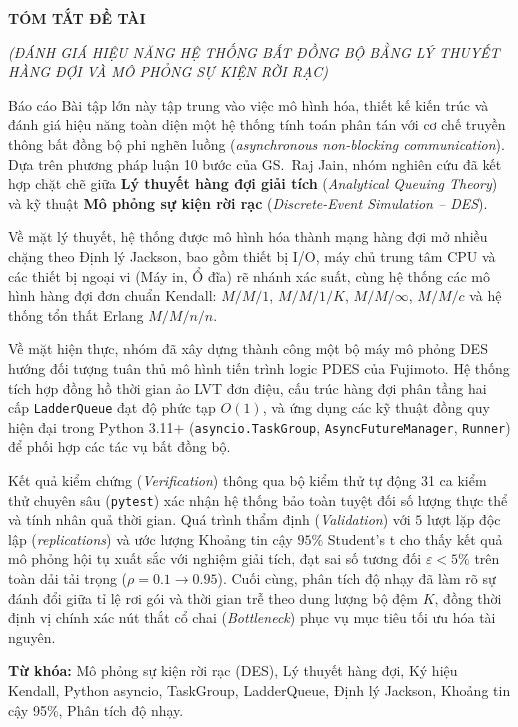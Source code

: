 \clearpage
{}
{}

\begin{center}
    \vspace*{-0.8cm}
    {\fontsize{15}{18}\selectfont\bfseries TÓM TẮT ĐỀ TÀI\par}
    \vspace{0.15cm}
    {\fontsize{10.5}{13}\selectfont\itshape (ĐÁNH GIÁ HIỆU NĂNG HỆ THỐNG BẤT ĐỒNG BỘ BẰNG LÝ THUYẾT HÀNG ĐỢI VÀ MÔ PHỎNG SỰ KIỆN RỜI RẠC)\par}
\end{center}

\vspace{0.35cm}

Báo cáo Bài tập lớn này tập trung vào việc mô hình hóa, thiết kế kiến trúc và đánh giá hiệu năng toàn diện một hệ thống tính toán phân tán với cơ chế truyền thông bất đồng bộ phi nghẽn luồng (\textit{asynchronous non-blocking communication}). Dựa trên phương pháp luận 10 bước của GS.~Raj Jain, nhóm nghiên cứu đã kết hợp chặt chẽ giữa \textbf{Lý thuyết hàng đợi giải tích} (\textit{Analytical Queuing Theory}) và kỹ thuật \textbf{Mô phỏng sự kiện rời rạc} (\textit{Discrete-Event Simulation -- DES}).

Về mặt lý thuyết, hệ thống được mô hình hóa thành mạng hàng đợi mở nhiều chặng theo Định lý Jackson, bao gồm thiết bị I/O, máy chủ trung tâm CPU và các thiết bị ngoại vi (Máy in, Ổ đĩa) rẽ nhánh xác suất, cùng hệ thống các mô hình hàng đợi đơn chuẩn Kendall: $M/M/1$, $M/M/1/K$, $M/M/\infty$, $M/M/c$ và hệ thống tổn thất Erlang $M/M/n/n$. 

Về mặt hiện thực, nhóm đã xây dựng thành công một bộ máy mô phỏng DES hướng đối tượng tuân thủ mô hình tiến trình logic PDES của Fujimoto. Hệ thống tích hợp đồng hồ thời gian ảo LVT đơn điệu, cấu trúc hàng đợi phân tầng hai cấp \texttt{LadderQueue} đạt độ phức tạp $O(1)$, và ứng dụng các kỹ thuật đồng quy hiện đại trong Python 3.11+ (\texttt{asyncio.TaskGroup}, \texttt{AsyncFutureManager}, \texttt{Runner}) để phối hợp các tác vụ bất đồng bộ.

Kết quả kiểm chứng (\textit{Verification}) thông qua bộ kiểm thử tự động 31 ca kiểm thử chuyên sâu (\texttt{pytest}) xác nhận hệ thống bảo toàn tuyệt đối số lượng thực thể và tính nhân quả thời gian. Quá trình thẩm định (\textit{Validation}) với $5$ lượt lặp độc lập (\textit{replications}) và ước lượng Khoảng tin cậy $95\%$ Student's t cho thấy kết quả mô phỏng hội tụ xuất sắc với nghiệm giải tích, đạt sai số tương đối $\varepsilon < 5\%$ trên toàn dải tải trọng ($\rho = 0.1 \to 0.95$). Cuối cùng, phân tích độ nhạy đã làm rõ sự đánh đổi giữa tỉ lệ rơi gói và thời gian trễ theo dung lượng bộ đệm $K$, đồng thời định vị chính xác nút thắt cổ chai (\textit{Bottleneck}) phục vụ mục tiêu tối ưu hóa tài nguyên.

\vspace{0.5cm}
\noindent
\textbf{Từ khóa:} Mô phỏng sự kiện rời rạc (DES), Lý thuyết hàng đợi, Ký hiệu Kendall, Python asyncio, TaskGroup, LadderQueue, Định lý Jackson, Khoảng tin cậy 95\%, Phân tích độ nhạy.
